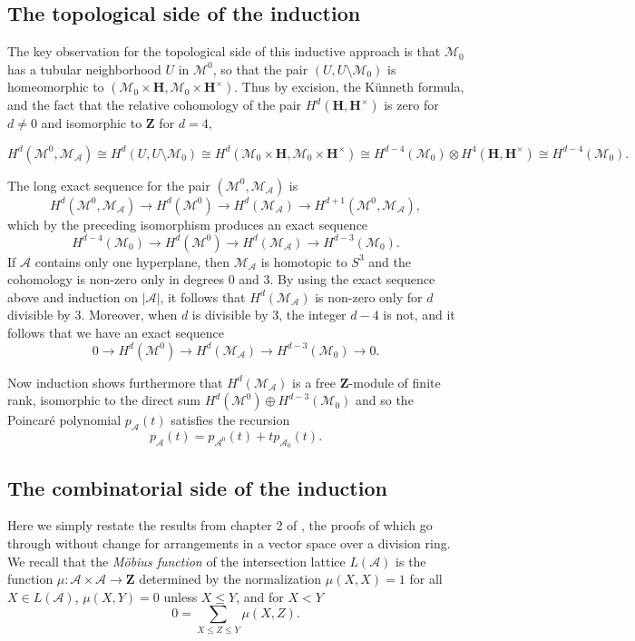 \documentclass[11pt, reqno]{amsart}
\numberwithin{equation}{section}
\theoremstyle{definition}
\theoremstyle{plain}
\newcommand{\HH}{\mathbf{H}}
\newcommand{\ZZ}{\mathbf{Z}}
\newcommand{\A}{\mathcal{A}}
\newcommand{\cM}{\mathcal{M}}
\begin{document}
\subsection{The topological side of the induction} The key observation for the topological side of this inductive approach is that $\cM_0$ has a tubular neighborhood $U$ in $\cM^0$, so that the pair $(U,U \setminus \cM_0)$ is homeomorphic to $(\cM_0 \times \HH,\cM_0 \times \HH^\times)$. Thus by excision, the K\"unneth formula, and the fact that the relative cohomology of the pair $H^d(\HH,\HH^\times)$ is zero for $d \neq 0$ and isomorphic to $\ZZ$ for $d=4$,

$$H^d(\cM^0,\cM_\A) \cong H^d(U,U \setminus \cM_0)\cong H^d(\cM_0 \times \HH,\cM_0 \times \HH^\times) \cong H^{d-4}(\cM_0) \otimes H^4(\HH,\HH^\times) \cong H^{d-4}(\cM_0).$$ 

The long exact sequence for the pair $(\cM^0,\cM_\A)$ is
$$H^d(\cM^0,\cM_\A) \to H^d(\cM^0) \to H^d(\cM_\A) \to H^{d+1}(\cM^0,\cM_\A),$$ which by the preceding isomorphism produces an exact sequence
$$H^{d-4}(\cM_0) \to H^d(\cM^0) \to H^d(\cM_\A) \to H^{d-3}(\cM_0).$$ If $\A$ contains only one hyperplane, then $\cM_\A$ is homotopic to $S^3$ and the cohomology is non-zero only in degrees $0$ and $3$. By using the exact sequence above and induction on $|\A|$, it follows that $H^d(\cM_\A)$ is non-zero only for $d$ divisible by $3$. Moreover, when $d$ is divisible by $3$, the integer $d-4$ is not, and it follows that we have an exact sequence
$$0 \to H^d(\cM^0) \to H^d(\cM_\A) \to H^{d-3}(\cM_0) \to 0.$$

Now induction shows furthermore that $H^d(\cM_\A)$ is a free $\ZZ$-module of finite rank, isomorphic to the direct sum $H^d(\cM^0) \oplus H^{d-3}(\cM_0)$ and so the Poincar\'e polynomial $p_\A(t)$ satisfies the recursion
\begin{equation} \label{p recursion}
p_\A(t)=p_{\A^0}(t)+tp_{\A_0}(t).
\end{equation}

\subsection{The combinatorial side of the induction} 

Here we simply restate the results from chapter 2 of \cite{OrTe}, the proofs of which go through without change for arrangements in a vector space over a division ring. We recall that the \emph{M\"obius function} of the intersection lattice $L(\A)$ is the function $\mu: \A \times \A \to \ZZ$ determined by the normalization $\mu(X,X)=1$ for all $X \in L(\A)$, $\mu(X,Y)=0$ unless $X \leq Y$, and for $X<Y$
$$0=\sum_{X \leq Z \leq Y} \mu(X,Z).$$ 
\end{document}
